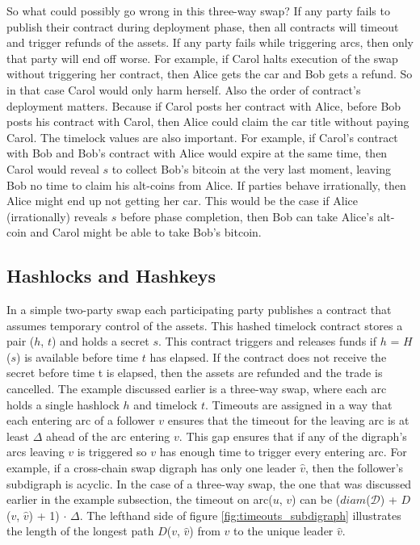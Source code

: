 So what could possibly go wrong in this three-way swap? If any party fails to publish their contract during deployment phase, then all contracts will timeout and trigger refunds of the assets. If any party fails while triggering arcs, then only that party will end off worse. For example, if Carol halts execution of the swap without triggering her contract, then Alice gets the car and Bob gets a refund. So in that case Carol would only harm herself. Also the order of contract's deployment matters. Because if Carol posts her contract with Alice, before Bob posts his contract with Carol, then Alice could claim the car title without paying Carol. The timelock values are also important. For example, if Carol's contract with Bob and Bob's contract with Alice would expire at the same time, then Carol would reveal $s$ to collect Bob's bitcoin at the very last moment, leaving Bob no time to claim his alt-coins from Alice. If parties behave irrationally, then Alice might end up not getting her car. This would be the case if Alice (irrationally) reveals $s$ before phase completion, then Bob can take Alice's alt-coin and Carol might be able to take Bob's bitcoin.


\subsection{Hashlocks and Hashkeys}
\label{subsec:background:second_section:hashlock_timelock}
In a simple two-party swap each participating party publishes a contract that assumes temporary control of the assets. This hashed timelock contract \cite{hashedtimelock} stores a pair ($h$, $t$) and holds a secret $s$. This contract triggers and releases funds if $h$ = $H$($s$) is available before time $t$ has elapsed. If the contract does not receive the secret before time t is elapsed, then the assets are refunded and the trade is cancelled. The example discussed earlier is a three-way swap, where each arc holds a single hashlock $h$ and timelock $t$. Timeouts are assigned in a way that each entering arc of a follower $v$ ensures that the timeout for the leaving arc is at least $\Delta$ ahead of the arc entering $v$. This gap ensures that if any of the digraph's arcs leaving $v$ is triggered so $v$ has enough time to trigger every entering arc. For example, if a cross-chain swap digraph has only one leader $\hat{v}$, then the follower's subdigraph is acyclic. In the case of a three-way swap, the one that was discussed earlier in the example subsection, the timeout on arc($u$, $v$) can be ($diam$($\mathcal{D}$) + $D$($v$, $\hat{v}$) + 1) $\cdot$ $\Delta$. The lefthand side of figure \ref{fig:timeouts_subdigraph} illustrates the length of the longest path $D$($v$, $\hat{v}$) from $v$ to the unique leader $\hat{v}$.



